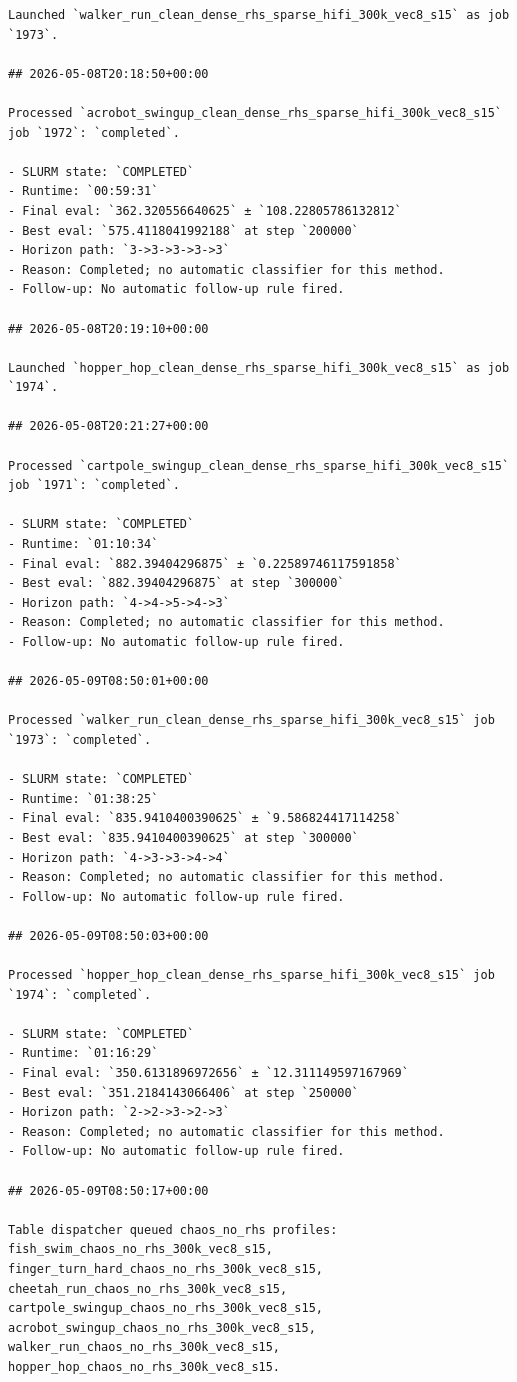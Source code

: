 \begin{verbatim}
Launched `walker_run_clean_dense_rhs_sparse_hifi_300k_vec8_s15` as job `1973`.

## 2026-05-08T20:18:50+00:00

Processed `acrobot_swingup_clean_dense_rhs_sparse_hifi_300k_vec8_s15` job `1972`: `completed`.

- SLURM state: `COMPLETED`
- Runtime: `00:59:31`
- Final eval: `362.320556640625` ± `108.22805786132812`
- Best eval: `575.4118041992188` at step `200000`
- Horizon path: `3->3->3->3->3`
- Reason: Completed; no automatic classifier for this method.
- Follow-up: No automatic follow-up rule fired.

## 2026-05-08T20:19:10+00:00

Launched `hopper_hop_clean_dense_rhs_sparse_hifi_300k_vec8_s15` as job `1974`.

## 2026-05-08T20:21:27+00:00

Processed `cartpole_swingup_clean_dense_rhs_sparse_hifi_300k_vec8_s15` job `1971`: `completed`.

- SLURM state: `COMPLETED`
- Runtime: `01:10:34`
- Final eval: `882.39404296875` ± `0.22589746117591858`
- Best eval: `882.39404296875` at step `300000`
- Horizon path: `4->4->5->4->3`
- Reason: Completed; no automatic classifier for this method.
- Follow-up: No automatic follow-up rule fired.

## 2026-05-09T08:50:01+00:00

Processed `walker_run_clean_dense_rhs_sparse_hifi_300k_vec8_s15` job `1973`: `completed`.

- SLURM state: `COMPLETED`
- Runtime: `01:38:25`
- Final eval: `835.9410400390625` ± `9.586824417114258`
- Best eval: `835.9410400390625` at step `300000`
- Horizon path: `4->3->3->4->4`
- Reason: Completed; no automatic classifier for this method.
- Follow-up: No automatic follow-up rule fired.

## 2026-05-09T08:50:03+00:00

Processed `hopper_hop_clean_dense_rhs_sparse_hifi_300k_vec8_s15` job `1974`: `completed`.

- SLURM state: `COMPLETED`
- Runtime: `01:16:29`
- Final eval: `350.6131896972656` ± `12.311149597167969`
- Best eval: `351.2184143066406` at step `250000`
- Horizon path: `2->2->3->2->3`
- Reason: Completed; no automatic classifier for this method.
- Follow-up: No automatic follow-up rule fired.

## 2026-05-09T08:50:17+00:00

Table dispatcher queued chaos_no_rhs profiles: fish_swim_chaos_no_rhs_300k_vec8_s15, finger_turn_hard_chaos_no_rhs_300k_vec8_s15, cheetah_run_chaos_no_rhs_300k_vec8_s15, cartpole_swingup_chaos_no_rhs_300k_vec8_s15, acrobot_swingup_chaos_no_rhs_300k_vec8_s15, walker_run_chaos_no_rhs_300k_vec8_s15, hopper_hop_chaos_no_rhs_300k_vec8_s15.


\end{verbatim}
